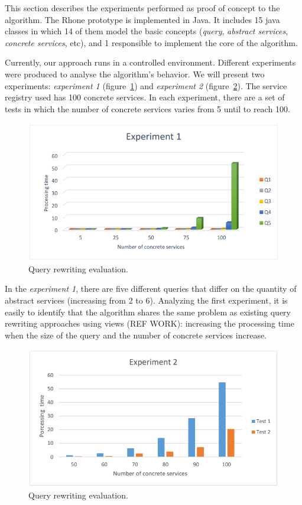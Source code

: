 This section describes the experiments performed as proof of concept to the algorithm.
The Rhone prototype is implemented in Java.
It includes 15 java classes in which 14 of them model the basic concepts 
(\textit{query}, \textit{abstract services}, \textit{concrete services}, etc), 
and 1 responsible to implement the core of the algorithm. 

Currently, our approach runs in a controlled environment. 
Different experiments were produced to analyse the algorithm's behavior.
We will present two experiments: \textit{experiment 1}
(figure~\ref{fig01}) and \textit{experiment 2} (figure~\ref{fig02}).
The service registry used has 100 concrete services. 
In each experiment, there are a set of tests in which the number of concrete 
services varies from 5 until to reach 100.

\begin{figure}[!h]
\centering
\includegraphics[scale=0.4]{exp1.png}
\caption{Query rewriting evaluation.}\label{fig01}
\end{figure} 

In the \textit{experiment 1}, there are five different queries that differ on
the quantity of abstract services (increasing from 2 to 6). Analyzing the first
experiment, it is easily to identify that the algorithm shares the same problem
as existing query rewriting approaches using views (REF WORK): increasing the
processing time when the size of the query and the number of concrete services increase.

\begin{figure}[!h]
\centering
\includegraphics[scale=0.4]{exp2.png}
\caption{Query rewriting evaluation.}\label{fig02}
\end{figure} 

